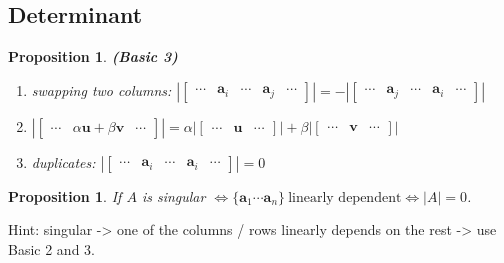 \documentclass[14pt]{article}
\newtheorem{proposition}[theorem]{Proposition}
\theoremstyle{definition}
\theoremstyle{remark}
\begin{document}
\begin{multicols}{2}
    \section{Determinant}
    \begin{proposition}\textbf{(Basic 3)}\hfill
        \begin{enumerate}
            \item swapping two columns: $|\begin{bmatrix}
                          \cdots & \bm{a}_i & \cdots & \bm{a}_j & \cdots
                      \end{bmatrix}| = -|\begin{bmatrix}
                          \cdots & \bm{a}_j & \cdots & \bm{a}_i & \cdots
                      \end{bmatrix}|$
            \item $|\begin{bmatrix}
                          \cdots & \alpha\bm{u}+\beta\bm{v} & \cdots
                      \end{bmatrix}| = \alpha|\begin{bmatrix}
                          \cdots & \bm{u} & \cdots
                      \end{bmatrix}| + \beta|\begin{bmatrix}
                          \cdots & \bm{v} & \cdots
                      \end{bmatrix}|$
            \item duplicates: $|\begin{bmatrix}
                          \cdots & \bm{a}_i & \cdots & \bm{a}_i & \cdots
                      \end{bmatrix}| = 0$
        \end{enumerate}
    \end{proposition}

    \begin{proposition}
        If $A$ is singular $\Longleftrightarrow \{\bm{a}_1 \cdots \bm{a}_n\} ~\text{linearly dependent} \Longleftrightarrow  |A|=0$.
    \end{proposition}
    Hint: singular -> one of the columns / rows linearly depends on the rest -> use Basic 2 and 3.


\end{multicols}
\end{document}
